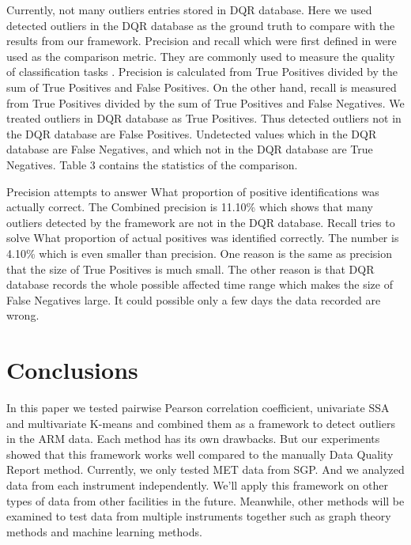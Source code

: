 \documentclass[letterpaper, 10 pt, conference]{ieeeconf}  %
\begin{document}
Currently, not many outliers entries stored in DQR database. Here we used detected outliers in the DQR database as the ground truth to compare with the results from our framework. Precision and recall which were first defined in \cite{perry1955machine} were used as the comparison metric. They are commonly used to measure the quality of classification tasks \cite{olson2008advanced}. Precision is calculated from True Positives divided by the sum of True Positives and False Positives. On the other hand, recall is measured from True Positives divided by the sum of True Positives and False Negatives. We treated outliers in DQR database as True Positives. Thus detected outliers not in the DQR database are False Positives. Undetected values which in the DQR database are False Negatives, and which not in the DQR database are True Negatives. Table 3 contains the statistics of the comparison.

Precision attempts to answer What proportion of positive identifications was actually correct. The Combined precision is 11.10\% which shows that many outliers detected by the framework are not in the DQR database. Recall tries to solve What proportion of actual positives was identified correctly. The number is 4.10\% which is even smaller than precision. One reason is the same as precision that the size of True Positives is much small. The other reason is that DQR database records the whole possible affected time range which makes the size of False Negatives large. It could possible only a few days the data recorded are wrong.

\section{Conclusions}
In this paper we tested pairwise Pearson correlation coefficient, univariate SSA and multivariate K-means and combined them as a framework to detect outliers in the ARM data. Each method has its own drawbacks. But our experiments showed that this framework works well compared to the manually Data Quality Report method. Currently, we only tested MET data from SGP. And we analyzed data from each instrument independently. We'll apply this framework on other types of data from other facilities in the future. Meanwhile, other methods will be examined to test data from multiple instruments together such as graph theory methods \cite{phillips2015graph} and machine learning methods. 

\end{document}
